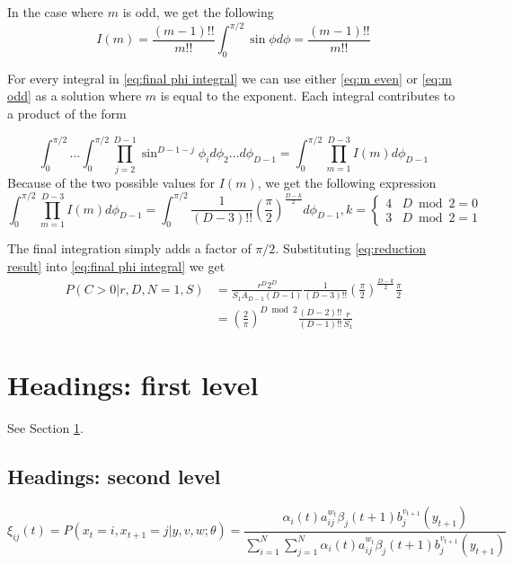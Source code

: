 \documentclass{article}
\begin{document}
In the case where $m$ is odd, we get the following
\begin{equation} \label{eq:m odd}
	I(m) = \frac{(m-1)!!}{m!!}\int_0^{\pi/2}\sin\phi d\phi = \frac{(m-1)!!}{m!!}
\end{equation}

For every integral in \ref{eq:final phi integral} we can use either \ref{eq:m even} or \ref{eq:m odd} as a solution where $m$ is equal to the exponent. Each integral contributes
to a product of the form

\begin{equation}
	\int_0^{\pi/2} \hdots \int_0^{\pi/2} \prod_{j=2}^{D-1}\sin^{D-1-j}\phi_i d\phi_2\hdots d\phi_{D-1} = \int_0^{\pi/2}\prod_{m=1}^{D-3}I(m) d\phi_{D-1}
\end{equation}
Because of the two possible values for $I(m)$, we get the following expression
\begin{equation} \label{eq:reduction result}
	\int_0^{\pi/2}\prod_{m=1}^{D-3}I(m) d\phi_{D-1} = \int_0^{\pi/2} \frac{1}{(D-3)!!}\left(\frac{\pi}{2}\right)^{\frac{D-k}{2}} d\phi_{D-1}, k= \begin{cases}
		4 & D\bmod 2 = 0\\
		3 & D\bmod 2 = 1
	\end{cases}
\end{equation}

The final integration simply adds a factor of $\pi/2$. Substituting \ref{eq:reduction result} into \ref{eq:final phi integral} we get
\begin{align}
	P(C>0|r, D, N=1, S) &= \frac{r^D2^D}{S_1 A_{D-1}(D-1)}\frac{1}{(D-3)!!}\left(\frac{\pi}{2}\right)^{\frac{D-k}{2}}\frac{\pi}{2}\\
	&= \left(\frac{2}{\pi}\right)^{D\bmod 2}\frac{(D-2)!!}{(D-1)!!}\frac{r}{S_1}
\end{align}
	

\section{Headings: first level}
\label{sec:headings}

\lipsum[4] See Section \ref{sec:headings}.

\subsection{Headings: second level}
\lipsum[5]
\begin{equation} 
	\xi _{ij}(t)=P(x_{t}=i,x_{t+1}=j|y,v,w;\theta)= {\frac {\alpha _{i}(t)a^{w_t}_{ij}\beta _{j}(t+1)b^{v_{t+1}}_{j}(y_{t+1})}{\sum _{i=1}^{N} \sum _{j=1}^{N} \alpha _{i}(t)a^{w_t}_{ij}\beta _{j}(t+1)b^{v_{t+1}}_{j}(y_{t+1})}}
\end{equation}
\end{document}
